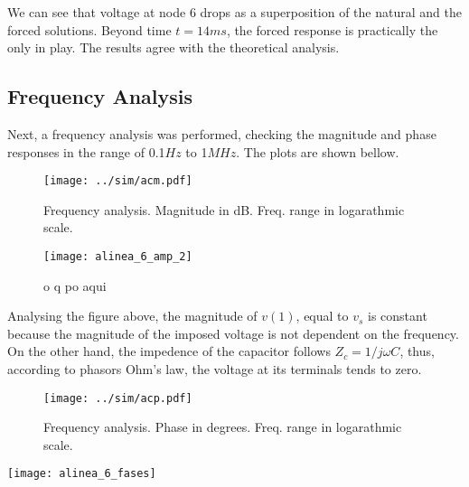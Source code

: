\par We can see that voltage at node 6 drops as a superposition of the natural and the forced solutions. Beyond time $t=14ms$, the forced response is practically the only in play. The results agree with the theoretical analysis.
\pagebreak
\subsection{Frequency Analysis}

\par Next, a frequency analysis was performed, checking the magnitude and phase responses in the range of 0.1$Hz$ to 1$MHz$. The plots are shown bellow.


\begin{figure}[H]
  \centering
  \texttt{[image: ../sim/acm.pdf]}
  \caption{Frequency analysis. Magnitude in dB. Freq. range in logarathmic scale.}
  \label{fig:sim_3}
\end{figure}


\begin{figure}[H]
  \centering
  \texttt{[image: alinea\_6\_amp\_2]}
  \caption{o q po aqui}
  \label{fig:fignodos_2}
\end{figure}


\par Analysing the figure above, the magnitude of $v(1)$, equal to $v_s$ is constant because the magnitude of the imposed voltage is not dependent on the frequency. On the other hand, the impedence of the capacitor follows $Z_c = 1/j\omega C$, thus, according to phasors Ohm's law, the voltage at its terminals tends to zero. 


\begin{figure}[H]
  \centering
  \texttt{[image: ../sim/acp.pdf]}
  \caption{Frequency analysis. Phase in degrees. Freq. range in logarathmic scale.}
  \label{fig:sim_3}
\end{figure}

\begin{center}
    \texttt{[image: alinea\_6\_fases]}
     \label{fig:amp(f)1_2}
\end{center}







